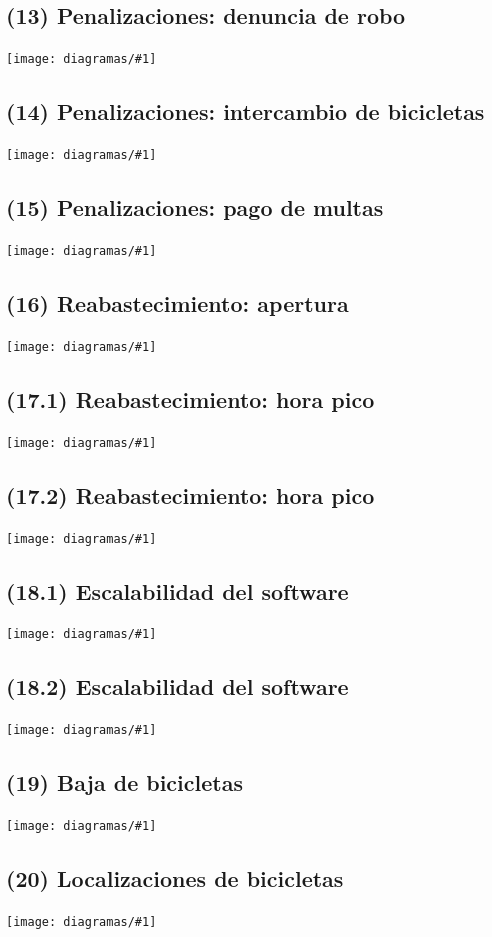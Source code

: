 \documentclass[a4paper, 10pt, twoside]{article}
\newcommand{\diagramav}[1]{
  \texttt{[image: diagramas/\#1]}
}
\begin{document}
\subsection{(13)   Penalizaciones: denuncia de robo}
\diagramav{objetivos-13}

\subsection{(14)   Penalizaciones: intercambio de bicicletas}
\diagramav{objetivos-14}

\subsection{(15)   Penalizaciones: pago de multas}
\diagramav{objetivos-15}

\subsection{(16)   Reabastecimiento: apertura}
\diagramav{objetivos-16}

\subsection{(17.1) Reabastecimiento: hora pico}
\diagramav{objetivos-17.1}

\subsection{(17.2) Reabastecimiento: hora pico}
\diagramav{objetivos-17.2}

\subsection{(18.1) Escalabilidad del software}
\diagramav{objetivos-18.1}

\subsection{(18.2) Escalabilidad del software}
\diagramav{objetivos-18.2}

\subsection{(19)   Baja de bicicletas}
\diagramav{objetivos-19}

\subsection{(20)   Localizaciones de bicicletas}
\diagramav{objetivos-20}
\end{document}
